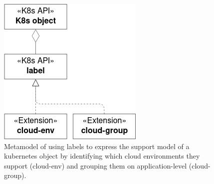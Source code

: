 \documentclass[../main.tex]{subfiles}
\begin{document}
    \begin{figure}[h]
        \centering
        \includegraphics[width=.5\linewidth]{img/concepts_metamodel_labels_v2.png}
        \captionsetup{justification=centering}
        \caption{
            Metamodel of using labels to express the support model of a \gls{kubernetes} object by identifying which \gls{cloud} environments they support (cloud-env) and grouping them on application-level (cloud-group).
        }
        \label{fig:labels_metamodel}
    \end{figure}
\end{document}
